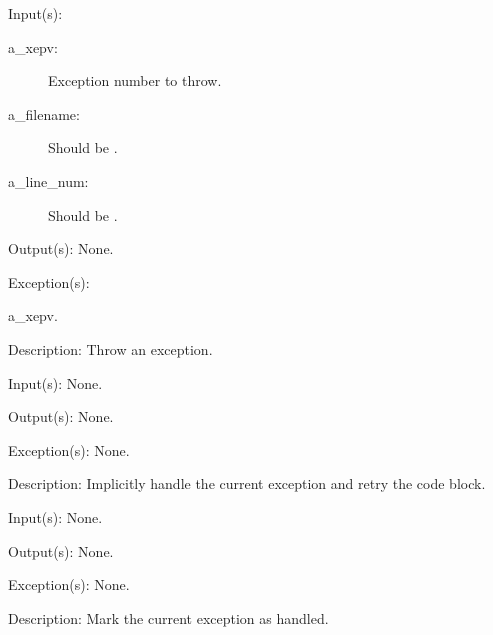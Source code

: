 \begin{capi}
\begin{capilist}
	\end{capilist}
\label{xep_throw_e}
\label{xep_throw}
	\begin{capilist}
	\item[Input(s): ]
		\begin{description}\item[]
		\item[a\_xepv: ]
			Exception number to throw.
		\item[a\_filename: ]
			Should be .
		\item[a\_line\_num: ]
			Should be .
		\end{description}
	\item[Output(s): ] None.
	\item[Exception(s): ]
		\begin{description}\item[]
		\item[a\_xepv.]
		\end{description}
	\item[Description: ]
		Throw an exception.
	\end{capilist}
\label{xep_retry}
	\begin{capilist}
	\item[Input(s): ] None.
	\item[Output(s): ] None.
	\item[Exception(s): ] None.
	\item[Description: ]
		Implicitly handle the current exception and retry the
		 code block.
	\end{capilist}
\label{xep_handled}
	\begin{capilist}
	\item[Input(s): ] None.
	\item[Output(s): ] None.
	\item[Exception(s): ] None.
	\item[Description: ]
		Mark the current exception as handled.
	\end{capilist}
\end{capi}
